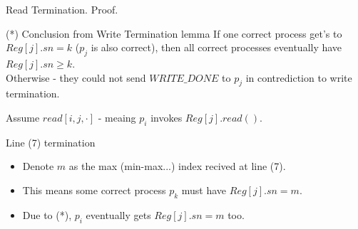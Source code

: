 \begin{frame}{Read Termination. Proof.}
    \begin{block}{(*) Conclusion from Write Termination lemma}
        If one correct process get's to $Reg[j].sn=k$ ($p_j$ is also correct),
        then all correct processes eventually have $Reg[j].sn\geq k$.\\
        Otherwise - they could not send $WRITE\_DONE$ to
        $p_j$ in contrediction to write termination.
    \end{block}
    Assume $read[i,j,\cdot]$ - meaing $p_i$ invokes $Reg[j].read()$.
    \begin{block}{Line (7) termination}
        \begin{itemize}
            \item Denote $m$ as the max (min-max...) index recived at line (7).
            \item This means some correct process $p_k$ must have $Reg[j].sn=m$.
            \item Due to (*), $p_i$ eventually gets $Reg[j].sn=m$ too.
        \end{itemize}
    \end{block}
\end{frame}
